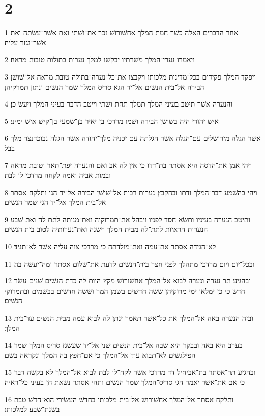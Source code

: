 \chapter{2}

\par 1 אחר הדברים האלה כשׁך חמת המלך אחשׁורושׁ זכר את־ושׁתי ואת אשׁר־עשׂתה ואת אשׁר־נגזר עליה׃
\par 2 ויאמרו נערי־המלך משׁרתיו יבקשׁו למלך נערות בתולות טובות מראה׃
\par 3 ויפקד המלך פקידים בכל־מדינות מלכותו ויקבצו את־כל־נערה־בתולה טובת מראה אל־שׁושׁן הבירה אל־בית הנשׁים אל־יד הגא סריס המלך שׁמר הנשׁים ונתון תמרקיהן׃
\par 4 והנערה אשׁר תיטב בעיני המלך תמלך תחת ושׁתי וייטב הדבר בעיני המלך ויעשׂ כן׃
\par 5 אישׁ יהודי היה בשׁושׁן הבירה ושׁמו מרדכי בן יאיר בן־שׁמעי בן־קישׁ אישׁ ימיני׃
\par 6 אשׁר הגלה מירושׁלים עם־הגלה אשׁר הגלתה עם יכניה מלך־יהודה אשׁר הגלה נבוכדנצר מלך בבל׃
\par 7 ויהי אמן את־הדסה היא אסתר בת־דדו כי אין לה אב ואם והנערה יפת־תאר וטובת מראה ובמות אביה ואמה לקחה מרדכי לו לבת׃
\par 8 ויהי בהשׁמע דבר־המלך ודתו ובהקבץ נערות רבות אל־שׁושׁן הבירה אל־יד הגי ותלקח אסתר אל־בית המלך אל־יד הגי שׁמר הנשׁים׃
\par 9 ותיטב הנערה בעיניו ותשׂא חסד לפניו ויבהל את־תמרוקיה ואת־מנותה לתת לה ואת שׁבע הנערות הראיות לתת־לה מבית המלך וישׁנה ואת־נערותיה לטוב בית הנשׁים׃
\par 10 לא־הגידה אסתר את־עמה ואת־מולדתה כי מרדכי צוה עליה אשׁר לא־תגיד׃
\par 11 ובכל־יום ויום מרדכי מתהלך לפני חצר בית־הנשׁים לדעת את־שׁלום אסתר ומה־יעשׂה בה׃
\par 12 ובהגיע תר נערה ונערה לבוא אל־המלך אחשׁורושׁ מקץ היות לה כדת הנשׁים שׁנים עשׂר חדשׁ כי כן ימלאו ימי מרוקיהן שׁשׁה חדשׁים בשׁמן המר ושׁשׁה חדשׁים בבשׂמים ובתמרוקי הנשׁים׃
\par 13 ובזה הנערה באה אל־המלך את כל־אשׁר תאמר ינתן לה לבוא עמה מבית הנשׁים עד־בית המלך׃
\par 14 בערב היא באה ובבקר היא שׁבה אל־בית הנשׁים שׁני אל־יד שׁעשׁגז סריס המלך שׁמר הפילגשׁים לא־תבוא עוד אל־המלך כי אם־חפץ בה המלך ונקראה בשׁם׃
\par 15 ובהגיע תר־אסתר בת־אביחיל דד מרדכי אשׁר לקח־לו לבת לבוא אל־המלך לא בקשׁה דבר כי אם את־אשׁר יאמר הגי סריס־המלך שׁמר הנשׁים ותהי אסתר נשׂאת חן בעיני כל־ראיה׃
\par 16 ותלקח אסתר אל־המלך אחשׁורושׁ אל־בית מלכותו בחדשׁ העשׂירי הוא־חדשׁ טבת בשׁנת־שׁבע למלכותו׃
